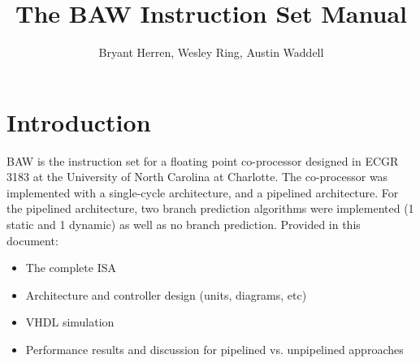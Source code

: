 \documentclass[a4paper,14pt]{article}
\title{The BAW Instruction Set Manual}
\author{Bryant Herren, Wesley Ring, Austin Waddell}
\date{}
\begin{document}
\newcommand\DescEntry[1]{%
  \multirow{1}*{%
    \begin{varwidth}{13em}%
    \flushright #1%
    \end{varwidth}}}

\newcommand\Tstrut{\rule{0pt}{2.6ex}}       %
\newcommand\Bstrut{\rule[-0.9ex]{0pt}{0pt}} %
\newcommand{\TBstrut}{\Tstrut\Bstrut} %
    
\null  %
\nointerlineskip  %
\vfill
\let\snewpage \newpage
\let\newpage \relax
\maketitle
\let \newpage \snewpage
\vfill 
\newpage

{\hypersetup{linktoc=all,hidelinks}
\tableofcontents
}
\newpage

\section{Introduction}
BAW is the instruction set for a floating point co-processor designed in ECGR 3183 at the University of North Carolina at Charlotte. The co-processor was implemented with a single-cycle architecture, and a pipelined architecture. For the pipelined architecture, two branch prediction algorithms were implemented (1 static and 1 dynamic) as well as no branch prediction.
\newline\newline
Provided in this document:
\begin{itemize}
    \setlength{\parskip}{0pt}
    \setlength{\itemsep}{0pt plus 1pt}
    \item The complete ISA
    \item Architecture and controller design (units, diagrams, etc)
    \item VHDL simulation
    \item Performance results and discussion for pipelined vs. unpipelined approaches
\end{itemize}
\end{document}
